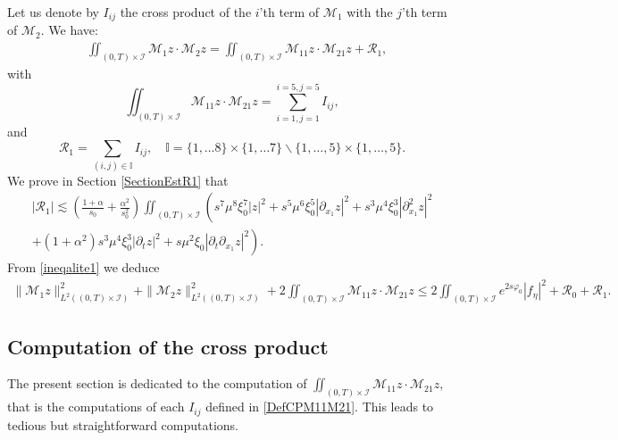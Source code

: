 \documentclass[a4paper, 12pt]{article}
\theoremstyle{plain}
\theoremstyle{definition}
\numberwithin{theorem}{section}
\numberwithin{equation}{section}
\begin{document}
{Let us denote by $I_{ij}$ the cross product of the $i$'th term of $\mathcal{M}_1$ with the $j$'th term of $\mathcal{M}_2$. We have:
\begin{align*}
&\iint_{(0,T)\times\mathcal{I}}\mathcal{M}_1z\cdot \mathcal{M}_2z=\iint_{(0,T)\times\mathcal{I}}\mathcal{M}_{11}z\cdot \mathcal{M}_{21}z+\mathcal{R}_1,
\end{align*}
with 
\begin{equation}\label{DefCPM11M21}
\iint_{(0,T)\times\mathcal{I}}\mathcal{M}_{11}z\cdot \mathcal{M}_{21}z=\sum\limits_{i=1,j=1}^{i=5,j=5}I_{ij},
\end{equation}
and
\begin{equation}\label{DefR1}
\mathcal{R}_1=\sum\limits_{(i,j)\in \mathbb{I}}I_{ij},\quad\mathbb{I}=\{1,\dots 8\}\times \{1,\dots 7\}\backslash \{1,\dots, 5\}\times \{1,\dots,5\}. 
\end{equation}
We prove in Section \ref{SectionEstR1} that 
\begin{multline}\label{EstR1}
\left|\mathcal{R}_1\right|\lesssim \left(\frac{1+\alpha}{s_0}+\frac{\alpha^2}{s_0^2}\right)\iint_{(0,T)\times\mathcal{I}}\left(s^7\mu^8\xi^7_0|z|^2+s^5\mu^6\xi_0^5|\partial_{x_1}z|^2+s^3\mu^4\xi_0^3|\partial^2_{x_1}z|^2\right.\\\left.+(1+\alpha^2)s^3\mu^4\xi_0^3|\partial_tz|^2+s\mu^2 \xi_0|\partial_t\partial_{x_1}z|^2\right).
\end{multline}
From \eqref{ineqalite1} we deduce
\begin{align}\label{ineqalite12}
\|\mathcal{M}_1z\|^2_{L^2((0,T)\times\mathcal{I})}+\|\mathcal{M}_2z\|^2_{L^2((0,T)\times\mathcal{I})}+2\iint_{(0,T)\times\mathcal{I}} \mathcal{M}_{11}z\cdot \mathcal{M}_{21}z
\leq 2\iint_{(0,T)\times\mathcal{I}}e^{2s\varphi_0}|f_\eta|^2+\mathcal{R}_0+\mathcal{R}_1.
\end{align}
\subsection{Computation of the cross product}
The present section is dedicated to the computation of $\iint_{(0,T)\times\mathcal{I}}\mathcal{M}_{11}z\cdot \mathcal{M}_{21}z$, that is the computations of each $I_{ij}$ defined in \eqref{DefCPM11M21}.  
This leads to tedious but straightforward computations. 
}
\end{document}
